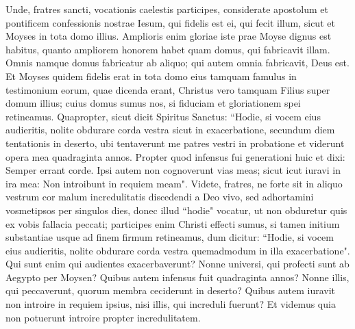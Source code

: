 \begin{biblechapter}  
\verse Unde, fratres sancti, vocationis caelestis participes, considerate apostolum et pontificem confessionis nostrae Iesum, 
\verse qui fidelis est ei, qui fecit illum, sicut et Moyses in tota domo illius. 
\verse Amplioris enim gloriae iste prae Moyse dignus est habitus, quanto ampliorem honorem habet quam domus, qui fabricavit illam. 
\verse Omnis namque domus fabricatur ab aliquo; qui autem omnia fabricavit, Deus est. 
\verse Et Moyses quidem fidelis erat in tota domo eius tamquam famulus in testimonium eorum, quae dicenda erant, 
\verse Christus vero tamquam Filius super domum illius; cuius domus sumus nos, si fiduciam et gloriationem spei retineamus. 
\verse Quapropter, sicut dicit Spiritus Sanctus: “Hodie, si vocem eius audieritis, 
\verse nolite obdurare corda vestra sicut in exacerbatione, secundum diem tentationis in deserto, 
\verse ubi tentaverunt me patres vestri in probatione et viderunt opera mea 
\verse quadraginta annos. Propter quod infensus fui generationi huic et dixi: Semper errant corde. Ipsi autem non cognoverunt vias meas; 
\verse sicut icut iuravi in ira mea: Non introibunt in requiem meam". 
\verse Videte, fratres, ne forte sit in aliquo vestrum cor malum incredulitatis discedendi a Deo vivo, 
\verse sed adhortamini vosmetipsos per singulos dies, donec illud “hodie" vocatur, ut non obduretur quis ex vobis fallacia peccati; 
\verse participes enim Christi effecti sumus, si tamen initium substantiae usque ad finem firmum retineamus, 
\verse dum dicitur: “Hodie, si vocem eius audieritis, nolite obdurare corda vestra quemadmodum in illa exacerbatione". 
\verse Qui sunt enim qui audientes exacerbaverunt? Nonne universi, qui profecti sunt ab Aegypto per Moysen? 
\verse Quibus autem infensus fuit quadraginta annos? Nonne illis, qui peccaverunt, quorum membra ceciderunt in deserto?  
\verse Quibus autem iuravit non introire in requiem ipsius, nisi illis, qui increduli fuerunt? 
\verse Et videmus quia non potuerunt introire propter incredulitatem. 
\end{biblechapter}

